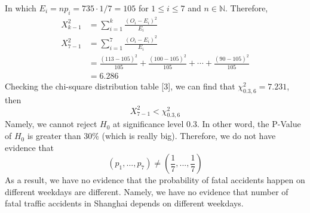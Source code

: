 \documentclass[a4paper,12pt]{article}
\begin{document}
\noindent
In which $E_i=np_i=735\cdot 1/7=105$ for $1\leq i\leq 7$ and $n\in\mathbb{N}$. Therefore,
\begin{equation}\label{weekday}
\begin{split}
X_{k-1}^{2}&=\sum_{i=1}^{k} \frac{\left(O_{i}-E_{i}\right)^{2}}{E_{i}}\\
X_{7-1}^{2}&=\sum_{i=1}^{7} \frac{\left(O_{i}-E_{i}\right)^{2}}{E_{i}}\\
&=\frac{(113-105)^{2}}{105}+\frac{(100-105)^{2}}{105}
+\cdots+\frac{(90-105)^{2}}{105}
\\&=6.286
\end{split}
\end{equation}
Checking the chi-square distribution table [3], we can find that $\chi_{0.3,6}^{2}=7.231$, then
$$X_{7-1}^{2}<\chi_{0.3,6}^{2}$$
Namely, we cannot reject $H_0$ at significance level 0.3. In other word, the P-Value of $H_0$ is greater than 30\% (which is really big). Therefore, we do not have evidence that
$$(p_1,...,p_7)\neq(\frac{1}{7},...,\frac{1}{7})$$
As a result, we have no evidence that the probability of fatal accidents  happen on different weekdays are different. Namely, we have no evidence that number of fatal traffic accidents in Shanghai depends on different weekdays.
\end{document}
